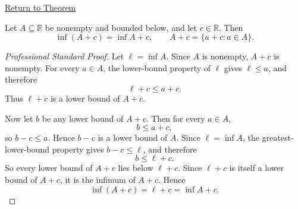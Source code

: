 \newpage
{}
\label{prf:translation-invariance-infimum}

\begin{remark*}[Return]
\hyperref[thm:translation-invariance-infimum]{Return to Theorem}
\end{remark*}

\begin{theorem*}
Let $A\subseteq\mathbb{R}$ be nonempty and bounded below, and let
$c\in\mathbb{R}$. Then
\[
  \inf(A+c)=\inf A+c,
  \qquad
  A+c=\{a+c:a\in A\}.
\]
\end{theorem*}

\begin{proof}[Professional Standard Proof]
\LRAProofBodyStart
Let \(\ell=\inf A\). Since \(A\) is nonempty, \(A+c\) is nonempty. For every
\(a\in A\), the lower-bound property of \(\ell\) gives \(\ell\le a\), and
therefore
\[
  \ell+c\le a+c.
\]
Thus \(\ell+c\) is a lower bound of \(A+c\).

Now let \(b\) be any lower bound of \(A+c\). Then for every \(a\in A\),
\[
  b\le a+c,
\]
so \(b-c\le a\). Hence \(b-c\) is a lower bound of \(A\). Since
\(\ell=\inf A\), the greatest-lower-bound property gives \(b-c\le \ell\), and
therefore
\[
  b\le \ell+c.
\]
So every lower bound of \(A+c\) lies below \(\ell+c\). Since \(\ell+c\) is
itself a lower bound of \(A+c\), it is the infimum of \(A+c\). Hence
\[
  \inf(A+c)=\ell+c=\inf A+c.
\]
\end{proof}

